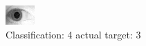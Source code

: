 \begin{figure}[h!]
\begin{center}
\includegraphics[width=0.60\columnwidth]{figures/ID1884_class_4_target_3.png}
\end{center}
\caption{ Classification: 4 actual target: 3}
\label{fig:ID1884_class_4_target_3}
\end{figure}
